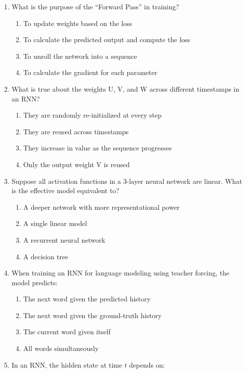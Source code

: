 \documentclass[12pt]{article}
\begin{document}
\begin{enumerate}[label=Q\arabic*.]
\begin{enumerate}[label=(\Alph*)]
\end{enumerate}
\item What is the purpose of the ``Forward Pass'' in training?
\begin{enumerate}[label=(\Alph*)]
    \item To update weights based on the loss
    \item To calculate the predicted output and compute the loss
    \item To unroll the network into a sequence
    \item To calculate the gradient for each parameter
\end{enumerate}
\item What is true about the weights U, V, and W across different timestamps in an RNN?
\begin{enumerate}[label=(\Alph*)]
    \item They are randomly re-initialized at every step
    \item They are reused across timestamps
    \item They increase in value as the sequence progresses
    \item Only the output weight V is reused
\end{enumerate}
\item Suppose all activation functions in a 3-layer neural network are linear. What is the effective model equivalent to?
\begin{enumerate}[label=(\Alph*)]
    \item A deeper network with more representational power
    \item A single linear model
    \item A recurrent neural network
    \item A decision tree
\end{enumerate}
\item When training an RNN for language modeling using teacher forcing, the model predicts:
\begin{enumerate}[label=(\Alph*)]
    \item The next word given the predicted history
    \item The next word given the ground-truth history
    \item The current word given itself
    \item All words simultaneously
\end{enumerate}
\item In an RNN, the hidden state at time $t$ depends on:
\begin{enumerate}[label=(\Alph*)]

\end{enumerate}
\end{enumerate}
\end{document}
